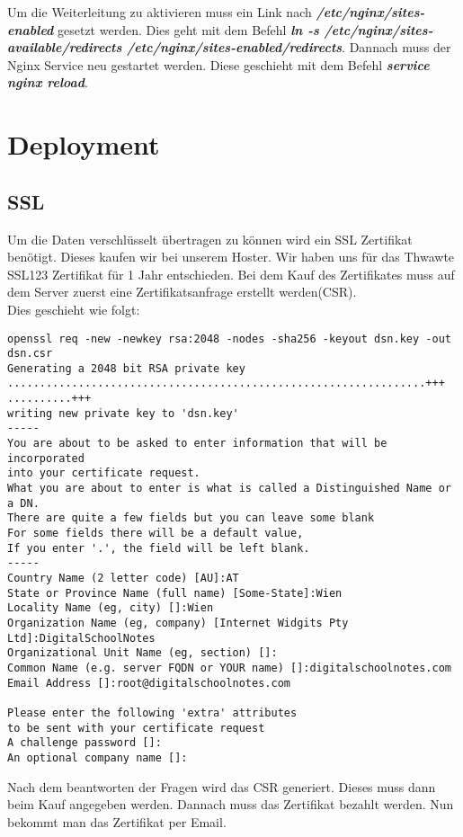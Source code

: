 \documentclass[12pt,a4paper,oneside,ngerman]{scrartcl}
\begin{document}
Um die Weiterleitung zu aktivieren muss ein Link nach \textbf{\textit{/etc/nginx/sites-enabled}} gesetzt werden. Dies geht mit dem Befehl \textbf{\textit{ln -s /etc/nginx/sites-available/redirects /etc/nginx/sites-enabled/redirects}}. Dannach muss der Nginx Service neu gestartet werden. Diese geschieht mit dem Befehl \textbf{\textit{service nginx reload}}.

\section{Deployment}
\subsection{SSL}
Um die Daten verschlüsselt übertragen zu können wird ein SSL Zertifikat benötigt. Dieses kaufen wir bei unserem Hoster. Wir haben uns für das Thwawte SSL123 Zertifikat\cite{CERT:1} für 1 Jahr entschieden. Bei dem Kauf des Zertifikates muss auf dem Server zuerst eine Zertifikatsanfrage erstellt werden(CSR).\\

Dies geschieht wie folgt\cite{CERT:2}:
\begin{lstlisting}
openssl req -new -newkey rsa:2048 -nodes -sha256 -keyout dsn.key -out dsn.csr
Generating a 2048 bit RSA private key
.................................................................+++
..........+++
writing new private key to 'dsn.key'
-----
You are about to be asked to enter information that will be incorporated
into your certificate request.
What you are about to enter is what is called a Distinguished Name or a DN.
There are quite a few fields but you can leave some blank
For some fields there will be a default value,
If you enter '.', the field will be left blank.
-----
Country Name (2 letter code) [AU]:AT
State or Province Name (full name) [Some-State]:Wien
Locality Name (eg, city) []:Wien
Organization Name (eg, company) [Internet Widgits Pty Ltd]:DigitalSchoolNotes
Organizational Unit Name (eg, section) []:
Common Name (e.g. server FQDN or YOUR name) []:digitalschoolnotes.com
Email Address []:root@digitalschoolnotes.com

Please enter the following 'extra' attributes
to be sent with your certificate request
A challenge password []:
An optional company name []:
\end{lstlisting}
Nach dem beantworten der Fragen wird das CSR generiert. Dieses muss dann beim Kauf angegeben werden. Dannach muss das Zertifikat bezahlt werden. Nun bekommt man das Zertifikat per Email.
\end{document}
